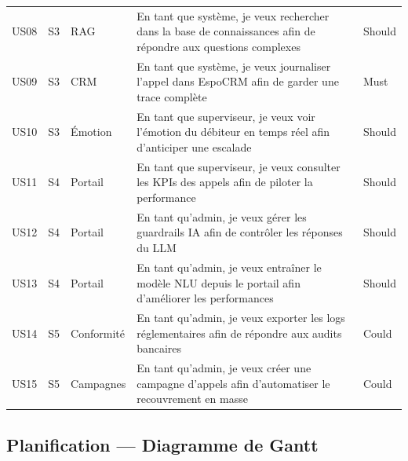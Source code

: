 \begin{longtable}{lllp{6cm}l}
  US08 & S3 & RAG         & En tant que système, je veux rechercher dans la base de connaissances afin de répondre aux questions complexes & Should \\
  US09 & S3 & CRM         & En tant que système, je veux journaliser l'appel dans EspoCRM afin de garder une trace complète & Must \\
  US10 & S3 & Émotion     & En tant que superviseur, je veux voir l'émotion du débiteur en temps réel afin d'anticiper une escalade & Should \\
  US11 & S4 & Portail     & En tant que superviseur, je veux consulter les KPIs des appels afin de piloter la performance & Should \\
  US12 & S4 & Portail     & En tant qu'admin, je veux gérer les guardrails IA afin de contrôler les réponses du LLM & Should \\
  US13 & S4 & Portail     & En tant qu'admin, je veux entraîner le modèle NLU depuis le portail afin d'améliorer les performances & Should \\
  US14 & S5 & Conformité  & En tant qu'admin, je veux exporter les logs réglementaires afin de répondre aux audits bancaires & Could \\
  US15 & S5 & Campagnes   & En tant qu'admin, je veux créer une campagne d'appels afin d'automatiser le recouvrement en masse & Could \\
\end{longtable}

\subsection{Planification — Diagramme de Gantt}



